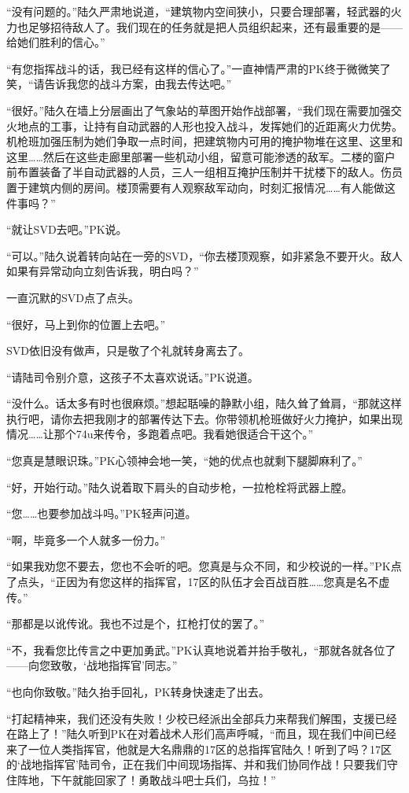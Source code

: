 “没有问题的。”陆久严肃地说道，“建筑物内空间狭小，只要合理部署，轻武器的火力也足够招待敌人了。我们现在的任务就是把人员组织起来，还有最重要的是——给她们胜利的信心。”

“有您指挥战斗的话，我已经有这样的信心了。”一直神情严肃的PK终于微微笑了笑，“请告诉我您的战斗方案，由我去传达吧。”

“很好。”陆久在墙上分层画出了气象站的草图开始作战部署，“我们现在需要加强交火地点的工事，让持有自动武器的人形也投入战斗，发挥她们的近距离火力优势。机枪班加强压制为她们争取一点时间，把建筑物内可用的掩护物堆在这里、这里和这里……然后在这些走廊里部署一些机动小组，留意可能渗透的敌军。二楼的窗户前布置装备了半自动武器的人员，三人一组相互掩护压制并干扰楼下的敌人。伤员置于建筑内侧的房间。楼顶需要有人观察敌军动向，时刻汇报情况……有人能做这件事吗？”

“就让SVD去吧。”PK说。

“可以。”陆久说着转向站在一旁的SVD，“你去楼顶观察，如非紧急不要开火。敌人如果有异常动向立刻告诉我，明白吗？”

一直沉默的SVD点了点头。

“很好，马上到你的位置上去吧。”

SVD依旧没有做声，只是敬了个礼就转身离去了。

“请陆司令别介意，这孩子不太喜欢说话。”PK说道。

“没什么。话太多有时也很麻烦。”想起聒噪的静默小组，陆久耸了耸肩，“那就这样执行吧，请你去把我刚才的部署传达下去。你带领机枪班做好火力掩护，如果出现情况……让那个74u来传令，多跑着点吧。我看她很适合干这个。”

“您真是慧眼识珠。”PK心领神会地一笑，“她的优点也就剩下腿脚麻利了。”

“好，开始行动。”陆久说着取下肩头的自动步枪，一拉枪栓将武器上膛。

“您……也要参加战斗吗。”PK轻声问道。

“啊，毕竟多一个人就多一份力。”

“如果我劝您不要去，您也不会听的吧。您真是与众不同，和少校说的一样。”PK点了点头，“正因为有您这样的指挥官，17区的队伍才会百战百胜……您真是名不虚传。”

“那都是以讹传讹。我也不过是个，扛枪打仗的罢了。”

“不，我看您比传言之中更加勇武。”PK认真地说着并抬手敬礼，“那就各就各位了——向您致敬，‘战地指挥官’同志。”

“也向你致敬。”陆久抬手回礼，PK转身快速走了出去。

“打起精神来，我们还没有失败！少校已经派出全部兵力来帮我们解围，支援已经在路上了！”陆久听到PK在对着战术人形们高声呼喊，“而且，现在我们中间已经来了一位人类指挥官，他就是大名鼎鼎的17区的总指挥官陆久！听到了吗？17区的‘战地指挥官’陆司令，正在我们中间现场指挥、并和我们协同作战！只要我们守住阵地，下午就能回家了！勇敢战斗吧士兵们，乌拉！”

